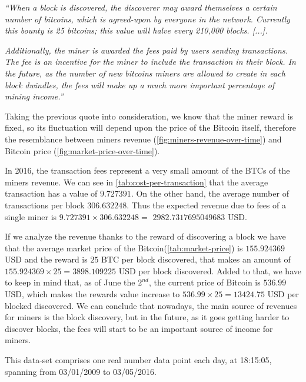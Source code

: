 \textit{``When a block is discovered, the discoverer may award
  themselves a certain number of bitcoins, which is agreed-upon by
  everyone in the network. Currently this bounty is 25 bitcoins; this
  value will halve every 210,000 blocks. [...]. } 

\textit{Additionally, the miner is awarded the fees paid by users
  sending transactions. The fee is an incentive for the miner to
  include the transaction in their block. In the future, as the number
  of new bitcoins miners are allowed to create in each block dwindles,
  the fees will make up a much more important percentage of mining
  income.''}

Taking the previous quote into consideration, we know that the miner
reward is fixed, so its fluctuation will depend upon the price of the
Bitcoin itself, therefore the resemblance between miners revenue
(\autoref{fig:miners-revenue-over-time}) and Bitcoin price
(\autoref{fig:market-price-over-time}).

In 2016, the transaction fees represent a very small amount of the
BTCs of the miners revenue. We can see in
\autoref{tab:cost-per-transaction} that the average transaction has a
value of $9.727391$. On the other hand, the average number of
transactions per block $306.632248$. Thus the expected revenue due to
fees of a single miner is $9.727391 \times 306.632248 = $
$2982.7317695049683$ USD.

If we analyze the revenue thanks to the reward of discovering a block
we have that the average market price of the
Bitcoin(\autoref{tab:market-price}) is $155.924369$ USD and the reward
is $25$ BTC per block discovered, that makes an amount of $155.924369
\times 25 = 3898.109225$ USD per block discovered. Added to that, we
have to keep in mind that, as of June the $2^{nd}$, the current price
of Bitcoin is $536.99$ USD, which makes the rewards value increase to
$536.99 \times 25 = 13424.75$ USD per blocked discovered. We can
conclude that nowadays, the main source of revenues for miners is the
block discovery, but in the future, as it goes getting harder to
discover blocks, the fees will start to be an important source of
income for miners. 

This data-set comprises one real number data point each day, at
18:15:05, spanning from 03/01/2009 to 03/05/2016.

